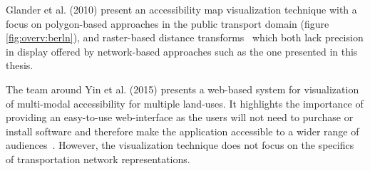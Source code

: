 

    Glander et al. (2010) present an accessibility map visualization technique
    with a focus on polygon-based approaches in the public transport domain
    \cite{Glander2010} (figure \ref{fig:overv:berln}), and raster-based distance
    transforms~\cite{Mueller2010} which both lack precision in display offered
    by network-based approaches such as the one presented in this thesis.\par




    The team around Yin et al. (2015) presents a web-based system for
    visualization of multi-modal accessibility for multiple land-uses. It
    highlights the importance of providing an easy-to-use web-interface as the
    users will not need to purchase or install software and therefore make the
    application accessible to a wider range of audiences~\cite{Yin2015}.
    However, the visualization technique does not focus on the specifics of
    transportation network representations.\par

